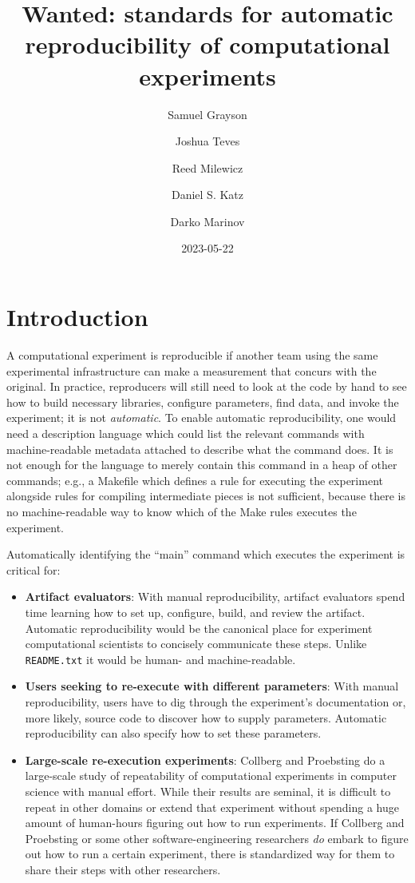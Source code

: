 \documentclass[manuscript,authordraft]{acmart}
\title{Wanted: standards for automatic reproducibility of computational
experiments}
\author{Samuel Grayson}
\affiliation{%
    \institution{University of Illinois Urbana-Champaign}%
    \department{Department of Computer Science}%
    \streetaddress{201 North Goodwin Avenue MC 258}%
    \city{Urbana}%
    \state{IL}%
    \postcode{61801-2302}%
    \country{USA}%
    }
\author{Joshua Teves}
\affiliation{%
    \institution{Sandia National Laboratories}%
    \department{Software Engineering and Research Department}%
    \streetaddress{1515 Eubank Blvd SE1515 Eubank Blvd SE}%
    \city{Albuquerque}%
    \state{NM}%
    \postcode{87123}%
    \country{USA}%
    }
\author{Reed Milewicz}
\affiliation{%
    \institution{Sandia National Laboratories}%
    \department{Software Engineering and Research Department}%
    \streetaddress{1515 Eubank Blvd SE1515 Eubank Blvd SE}%
    \city{Albuquerque}%
    \state{NM}%
    \postcode{87123}%
    \country{USA}%
    }
\author{Daniel S. Katz}
\affiliation{%
    \institution{University of Illinois Urbana-Champaign Department of
Computer Science}%
    \department{Department of Computer Science}\department{National
Center for Supercomputing Applications}\department{Deparment of
Electrical and Computer Engineering}\department{School of Information
Sciences}%
    \streetaddress{201 North Goodwin Avenue MC 258}%
    \city{Urbana}%
    \state{IL}%
    \postcode{61801-2302}%
    \country{USA}%
    }
\author{Darko Marinov}
\affiliation{%
    \institution{University of Illinois Urbana-Champaign}%
    \department{Department of Computer Science}%
    \streetaddress{201 North Goodwin Avenue MC 258}%
    \city{Urbana}%
    \state{IL}%
    \postcode{61801-2302}%
    \country{USA}%
    }
\date{2023-05-22}
\begin{document}
\maketitle

\renewcommand{\shortauthors}{Grayson et al.}


\hypertarget{introduction}{%
\section{Introduction}\label{introduction}}

A computational experiment is reproducible if another team using the
same experimental infrastructure can make a measurement that concurs
with the original. In practice, reproducers will still need to look at
the code by hand to see how to build necessary libraries, configure
parameters, find data, and invoke the experiment; it is not
\emph{automatic}. To enable automatic reproducibility, one would need a
description language which could list the relevant commands with
machine-readable metadata attached to describe what the command does. It
is not enough for the language to merely contain this command in a heap
of other commands; e.g., a Makefile which defines a rule for executing
the experiment alongside rules for compiling intermediate pieces is not
sufficient, because there is no machine-readable way to know which of
the Make rules executes the experiment.

Automatically identifying the ``main'' command which executes the
experiment is critical for:

\begin{itemize}
\item
  \textbf{Artifact evaluators}: With manual reproducibility, artifact
  evaluators spend time learning how to set up, configure, build, and
  review the artifact. Automatic reproducibility would be the canonical
  place for experiment computational scientists to concisely communicate
  these steps. Unlike \texttt{README.txt} it would be human- and
  machine-readable.
\item
  \textbf{Users seeking to re-execute with different parameters}: With
  manual reproducibility, users have to dig through the experiment's
  documentation or, more likely, source code to discover how to supply
  parameters. Automatic reproducibility can also specify how to set
  these parameters.
\item
  \textbf{Large-scale re-execution experiments}: Collberg and Proebsting
  \cite{collberg_repeatability_2016} do a large-scale study of
  repeatability of computational experiments in computer science with
  manual effort. While their results are seminal, it is difficult to
  repeat in other domains or extend that experiment without spending a
  huge amount of human-hours figuring out how to run experiments. If
  Collberg and Proebsting or some other software-engineering researchers
  \emph{do} embark to figure out how to run a certain experiment, there
  is standardized way for them to share their steps with other
  researchers.
\end{itemize}
\end{document}
